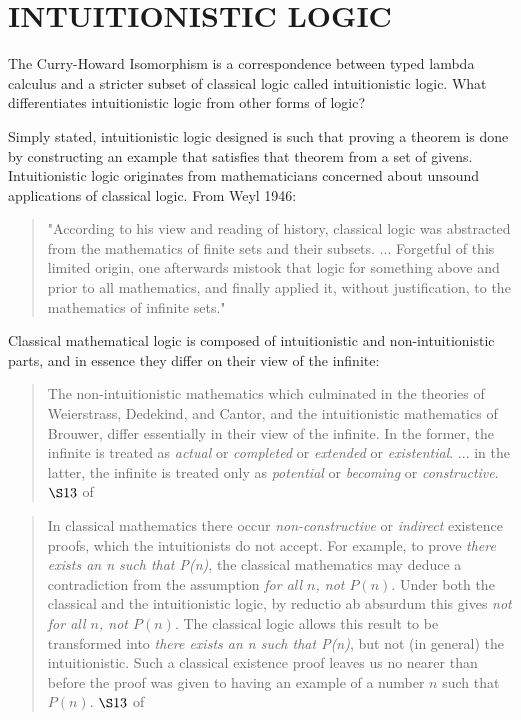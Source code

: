\chapter{INTUITIONISTIC LOGIC}\label{ch:logic}
The Curry-Howard Isomorphism is a correspondence between typed lambda calculus and a stricter subset of classical logic called intuitionistic logic. What differentiates intuitionistic logic from other forms of logic?

Simply stated, intuitionistic logic designed is such that proving a theorem is done by constructing an example that satisfies that theorem from a set of givens. Intuitionistic logic originates from mathematicians concerned about unsound applications of classical logic. From Weyl 1946:
\begin{quote}
"According to his view and reading of history, classical logic was abstracted from the mathematics of finite sets and their subsets. ... Forgetful of this limited origin, one afterwards mistook that logic for something above and prior to all mathematics, and finally applied it, without justification, to the mathematics of infinite sets."
\end{quote}

Classical mathematical logic is composed of intuitionistic and non-intuitionistic parts, and in essence they differ on their view of the infinite:
\begin{quote}
The non-intuitionistic mathematics which culminated in the theories of Weierstrass, Dedekind, and Cantor, and the intuitionistic mathematics of Brouwer, differ essentially in their view of the infinite. In the former, the infinite is treated as \emph{actual} or \emph{completed} or \emph{extended} or \emph{existential}. ... in the latter, the infinite is treated only as \emph{potential} or \emph{becoming} or \emph{constructive}.
$\S 13$ of \cite{metamath}
\end{quote}

\begin{quote}
In classical mathematics there occur \emph{non-constructive} or \emph{indirect} existence proofs, which the intuitionists do not accept. For example, to prove \emph{there exists an n such that P(n)}, the classical mathematics may deduce a contradiction from the assumption \emph{for all $n$, not $P(n)$}. Under both the classical and the intuitionistic logic, by reductio ab absurdum this gives \emph{not for all $n$, not $P(n)$}. The classical logic allows this result to be transformed into \emph{there exists an n such that P(n)}, but not (in general) the intuitionistic. Such a classical existence proof leaves us no nearer than before the proof was given to having an example of a number $n$ such that $P(n)$. $\S 13$ of \cite{metamath}
\end{quote}

